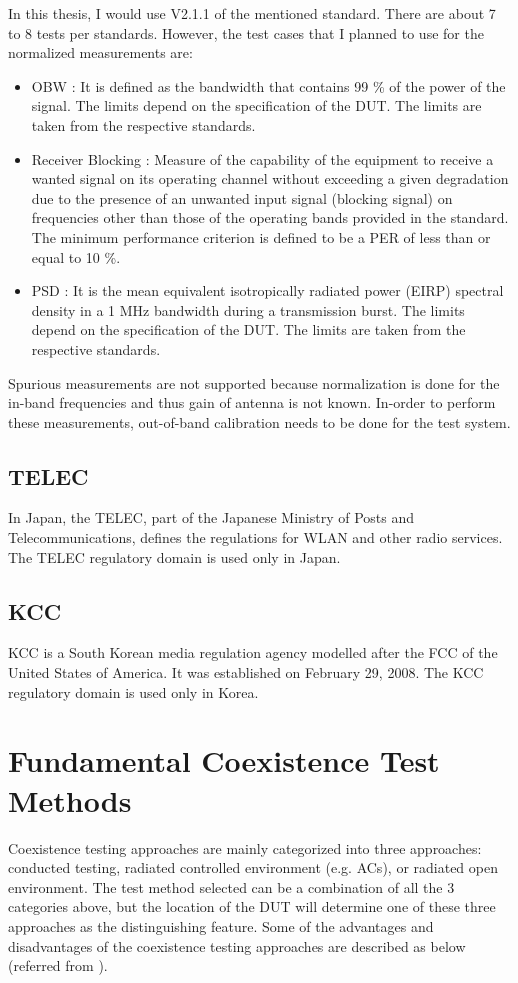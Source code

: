 In this thesis, I would use V2.1.1 of the mentioned standard. There are about 7 to 8 tests per standards. However, the test cases that I planned to use for the normalized measurements are:
\begin{itemize}
\item \acf{OBW} \cite{etsi300328}: It is defined as the bandwidth that contains 99 \% of the power of the signal. The limits depend on the specification of the \acs{DUT}. The limits are taken from the respective standards.
\item Receiver Blocking \cite{etsi300328}:  Measure of the capability of the equipment to receive a wanted signal on its operating channel without exceeding a given degradation due to the presence of an unwanted input signal (blocking signal) on frequencies other than those of the operating bands provided in the standard. The minimum performance criterion is defined to be a \acf{PER} of less than or equal to 10 \%.
\item \acf{PSD} \cite{etsi300328}: It is the mean equivalent isotropically radiated power (\acs{EIRP}) spectral density in a 1 MHz bandwidth during a transmission burst. The limits depend on the specification of the \acs{DUT}. The limits are taken from the respective standards.
\end{itemize}
Spurious measurements are not supported because normalization is done for the in-band frequencies and thus gain of antenna is not known. In-order to perform these measurements, out-of-band calibration needs to be done for the test system. 


\subsection{\acf{TELEC}}
In Japan, the \acf{TELEC}, part of the Japanese Ministry of Posts and Telecommunications, defines the regulations for \acs{WLAN} and other radio services. The \acs{TELEC} regulatory domain is used only in Japan.


\subsection{\acf{KCC}}
\acs{KCC} is a South Korean media regulation agency modelled after the \acf{FCC} of the United States of America. It was established on February 29, 2008. The \acs{KCC} regulatory domain is used only in Korea.
 

\section{Fundamental Coexistence Test Methods}
Coexistence testing approaches are mainly categorized into three approaches: conducted testing, radiated controlled environment (e.g. \acsp{AC}), or radiated open environment. The test method selected can be a combination of all the 3 categories above, but the location of the \acs{DUT} will determine one of these three approaches as the distinguishing feature. Some of the advantages and disadvantages of the coexistence testing approaches are described as below (referred from \cite{gonzalez}).

